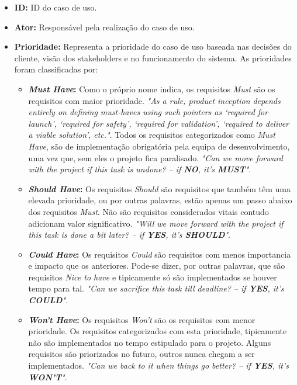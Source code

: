 \begin{itemize}
	\item \textbf{ID:} ID do caso de uso.
	\item \textbf{Ator:} Responsável pela realização do caso de uso.
	\item \textbf{Prioridade:} Representa a prioridade do caso de uso baseada nas decisões do cliente, visão dos stakeholders e no funcionamento do sistema. As prioridades foram classificadas por:
	\begin{itemize}
		\item \textbf{\textit{Must Have}:} Como o próprio nome indica, os requisitos \textit{Must} são os requisitos com maior prioridade. \textit{"As a rule, product inception depends entirely on defining must-haves using such pointers as ‘required for launch’, ‘required for safety’, ‘required for validation’, ‘required to deliver a viable solution’, etc."}\cite{moscow}. Todos os requisitos categorizados como \textit{Must Have}, são de implementação obrigatória pela equipa de desenvolvimento, uma vez que, sem eles o projeto fica paralisado.\textit{ "Can we move forward with the project if this task is undone? – if \textbf{NO}, it’s \textbf{MUST}"}\cite{moscow}.
		\item \textbf{\textit{Should Have}:} Os requisitos \textit{Should} são requisitos que também têm uma elevada prioridade, ou por outras palavras, estão apenas um passo abaixo dos requisitos \textit{Must}.
		Não são requisitos considerados vitais contudo adicionam valor significativo.\textit{ "Will we move forward with the project if this task is done a bit later? – if \textbf{YES}, it’s \textbf{SHOULD}"}\cite{moscow}.
		\item \textbf{\textit{Could Have}:} Os requisitos \textit{Could} são requisitos com menos importancia e impacto que os anteriores. Pode-se dizer, por outras palavras, que são requisitos \textit{Nice to have} e tipicamente só são implementados se houver tempo para tal. \textit{ "Can we sacrifice this task till deadline? – if \textbf{YES}, it’s \textbf{COULD}"}\cite{moscow}.
		\item \textbf{\textit{Won't Have}:} Os requisitos \textit{Won't} são os requisitos com menor prioridade. Os requisitos categorizados com esta prioridade, tipicamente não são implementados no tempo estipulado para o projeto. Alguns requisitos são priorizados no futuro, outros nunca chegam a ser implementados. \textit{ "Can we back to it when things go better? – if \textbf{YES}, it’s \textbf{WON’T}"}\cite{moscow}.
	\end{itemize}

\end{itemize}
